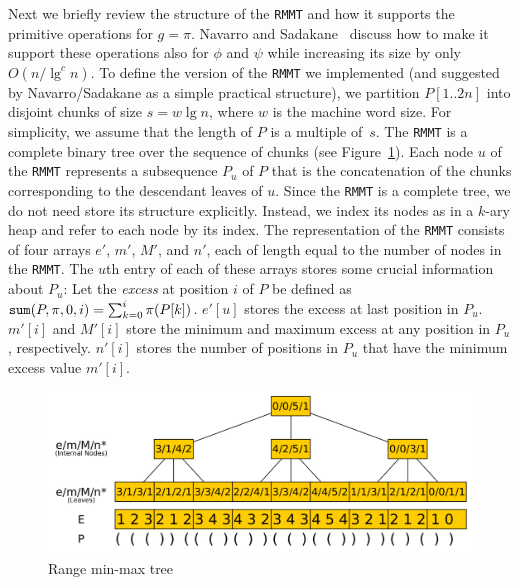 Next we briefly review the structure of the {\tt RMMT} and how it supports
the primitive operations for $g = \pi$.
Navarro and Sadakane~\cite{Navarro:2014:FFS:2620785.2601073} discuss how
to make it support these operations also for $\phi$ and $\psi$ while increasing
its size by only $O(n/\lg^c n)$.
To define the version of the {\tt RMMT} we implemented (and suggested by
Navarro/Sadakane as a simple practical structure), we partition $P[1..2n]$ into
disjoint chunks of size $s = w \lg n$, where $w$ is the machine word size.
For simplicity, we assume that the length of $P$ is a multiple of~$s$.
The {\tt RMMT} is a complete binary tree over the sequence of chunks
(see Figure~\ref{fig:RangeMinMaxTree}).
Each node $u$ of the {\tt RMMT} represents a subsequence $P_u$ of $P$ that is
the concatenation of the chunks corresponding to the descendant leaves of $u$.
Since the {\tt RMMT} is a complete tree, we do not need store its structure
explicitly.
Instead, we index its nodes as in a $k$-ary heap and refer to each node by
its index.
The representation of the {\tt RMMT} consists of four arrays $e'$, $m'$,
$M'$, and $n'$, each of length equal to the number of nodes in the {\tt RMMT}.
The $u$th entry of each of these arrays stores some crucial information about
$P_u$:
Let the {\em excess} at position $i$ of $P$ be defined as $\mathtt{sum}(P,\pi,0,i) =
\sum_{k=0}^{i} \pi(P[k])$.
$e'[u]$ stores the excess at last position in $P_u$.
$m'[i]$ and $M'[i]$ store the minimum and maximum excess at any position in
$P_u$, respectively.
$n'[i]$ stores the number of positions in $P_u$ that have the minimum excess
value $m'[i]$.

\begin{figure}[b]
  \centering
  \includegraphics[scale=0.18]{./images/Range-min-max-tree.png}
  \caption{Range min-max tree}
  \label{fig:RangeMinMaxTree}
\end{figure}

